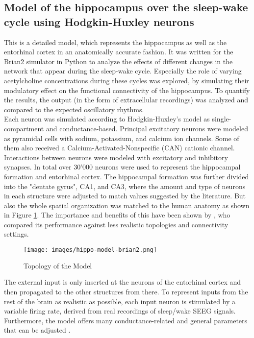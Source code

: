     \subsection{Model of the hippocampus over the sleep-wake cycle using Hodgkin-Huxley neurons}
    This is a detailed model, which represents the hippocampus as well as the entorhinal cortex in an anatomically accurate fashion. It was written for the Brian2 simulator in Python to analyze the effects of different changes in the network that appear during the sleep-wake cycle. Especially the role of varying acetylcholine concentrations during these cycles was explored, by simulating their modulatory effect on the functional connectivity of the hippocampus. To quantify the results, the output (in the form of extracellular recordings) was analyzed and compared to the expected oscillatory rhythms. \\
    Each neuron was simulated according to Hodgkin-Huxley's model as single-compartment and conductance-based. Principal excitatory neurons were modeled as pyramidal cells with sodium, potassium, and calcium ion channels. Some of them also received a Calcium-Activated-Nonspecific (CAN) cationic channel. Interactions between neurons were modeled with excitatory and inhibitory synapses. In total over 30'000 neurons were used to represent the hippocampal formation and entorhinal cortex. The hippocampal formation was further divided into the "dentate gyrus", CA1, and CA3, where the amount and type of neurons in each structure were adjusted to match values suggested by the literature. But also the whole spatial organization was matched to the human anatomy as shown in Figure \ref{fig:hippocampus-model}. The importance and benefits of this have been shown by \textcite{Aussel.2018}, who compared its performance against less realistic topologies and connectivity settings.
    \begin{figure}[H]
        \centering
        \texttt{[image: images/hippo-model-brian2.png]}
        \caption{Topology of the Model \cite{Aussel.2018}}
        \label{fig:hippocampus-model}
    \end{figure}
    The external input is only inserted at the neurons of the entorhinal cortex and then propagated to the other structures from there. To represent inputs from the rest of the brain as realistic as possible, each input neuron is stimulated by a variable firing rate, derived from real recordings of sleep/wake SEEG signals. Furthermore, the model offers many conductance-related and general parameters that can be adjusted \cite{Aussel.2018}. 
    

